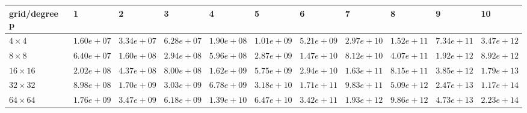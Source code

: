 \begin{tabular}{lllllllllll}
\hline
 grid/degree p   & 1          & 2          & 3          & 4          & 5          & 6          & 7          & 8          & 9          & 10         \\
\hline
 $4 \times 4$    & $1.60e+07$ & $3.34e+07$ & $6.28e+07$ & $1.90e+08$ & $1.01e+09$ & $5.21e+09$ & $2.97e+10$ & $1.52e+11$ & $7.34e+11$ & $3.47e+12$ \\
 $8 \times 8$    & $6.40e+07$ & $1.60e+08$ & $2.94e+08$ & $5.96e+08$ & $2.87e+09$ & $1.47e+10$ & $8.12e+10$ & $4.07e+11$ & $1.92e+12$ & $8.92e+12$ \\
 $16 \times 16$  & $2.02e+08$ & $4.37e+08$ & $8.00e+08$ & $1.62e+09$ & $5.75e+09$ & $2.94e+10$ & $1.63e+11$ & $8.15e+11$ & $3.85e+12$ & $1.79e+13$ \\
 $32 \times 32$  & $8.98e+08$ & $1.70e+09$ & $3.03e+09$ & $6.78e+09$ & $3.18e+10$ & $1.71e+11$ & $9.83e+11$ & $5.09e+12$ & $2.47e+13$ & $1.17e+14$ \\
 $64 \times 64$  & $1.76e+09$ & $3.47e+09$ & $6.18e+09$ & $1.39e+10$ & $6.47e+10$ & $3.42e+11$ & $1.93e+12$ & $9.86e+12$ & $4.73e+13$ & $2.23e+14$ \\
\hline
\end{tabular}